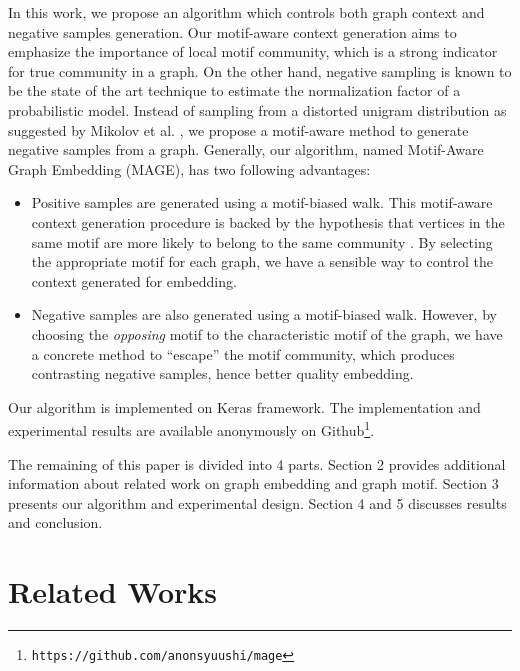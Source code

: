 \documentclass[letterpaper]{article}
\begin{document}
        In this work, we propose an algorithm which controls both graph context and negative samples
        generation. Our motif-aware context generation aims to emphasize the importance of local
        motif community, which is a strong indicator for true community in a graph. On the other hand,
        negative sampling is known to be the state of the art technique to estimate the normalization
        factor of a probabilistic model. Instead of sampling from a distorted unigram distribution as
        suggested by Mikolov et al. \cite{skipgram}, we propose a motif-aware method to generate 
        negative samples from a graph. Generally, our algorithm, named Motif-Aware Graph Embedding (MAGE),
        has two following advantages:

        \begin{itemize}
            \setlength{\parskip}{0pt}
            \item Positive samples are generated using a motif-biased walk. This motif-aware context 
                generation procedure is backed by the hypothesis that vertices in the same motif
                are more likely to belong to the same community \cite{juremotif}.
                By selecting the appropriate motif for each graph, we have a sensible way to control
                the context generated for embedding.
            \item Negative samples are also generated using a motif-biased walk. However, by choosing
                the \emph{opposing} motif to the characteristic motif of the graph, we have a concrete
                method to ``escape'' the motif community, which produces contrasting negative
                samples, hence better quality embedding.
        \end{itemize}

        Our algorithm is implemented on Keras \cite{keras} framework. The implementation and experimental
        results are available anonymously on Github\footnote{\texttt{https://github.com/anonsyuushi/mage}}.

        The remaining of this paper is divided into 4 parts. Section 2 provides additional information
        about related work on graph embedding and graph motif. Section 3 presents our algorithm and
        experimental design. Section 4 and 5 discusses results and conclusion.

    \section{Related Works}
\end{document}
